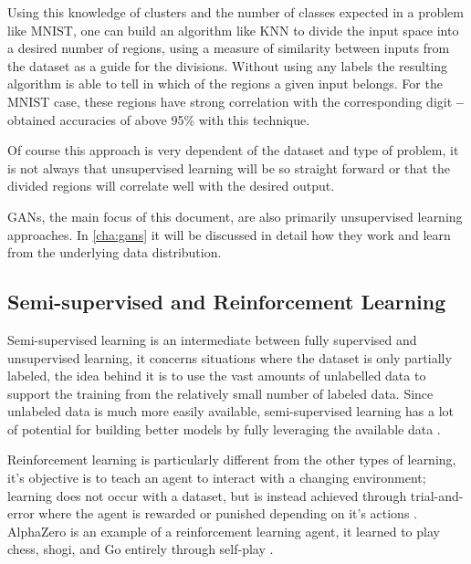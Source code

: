 Using this knowledge of clusters and the number of classes expected in a problem like \gls{MNIST}, one can build an algorithm like \gls{KNN} to divide the input space into a desired number of regions, using a measure of similarity between inputs from the dataset as a guide for the divisions. Without using any labels the resulting algorithm is able to tell in which of the regions a given input belongs. For the \gls{MNIST} case, these regions have strong correlation with the corresponding digit \textbf{--} \cite{fashionMNIST2017} obtained accuracies of above 95\% with this technique.

Of course this approach is very dependent of the dataset and type of problem, it is not always that unsupervised learning will be so straight forward or that the divided regions will correlate well with the desired output.

\acp{GAN}, the main focus of this document, are also primarily unsupervised learning approaches. In \autoref{cha:gans} it will be discussed in detail how they work and learn from the underlying data distribution.

\subsection{Semi-supervised and Reinforcement Learning} \label{sub:semi-supervised_and_RL}
Semi-supervised learning is an intermediate between fully supervised and unsupervised learning, it concerns situations where the dataset is only partially labeled, the idea behind it is to use the vast amounts of unlabelled data to support the training from the relatively small number of labeled data. Since unlabeled data is much more easily available, semi-supervised learning has a lot of potential for building better models by fully leveraging the available data \cite{semi_supervised2005}.

Reinforcement learning is particularly different from the other types of learning, it's objective is to teach an agent to interact with a changing environment; learning does not occur with a dataset, but is instead achieved through trial-and-error where the agent is rewarded or punished depending on it's actions \cite{reinforcement_learning1996}. AlphaZero is an example of a reinforcement learning agent, it learned to play chess, shogi, and Go entirely through self-play \cite{alphaZero2017}.
